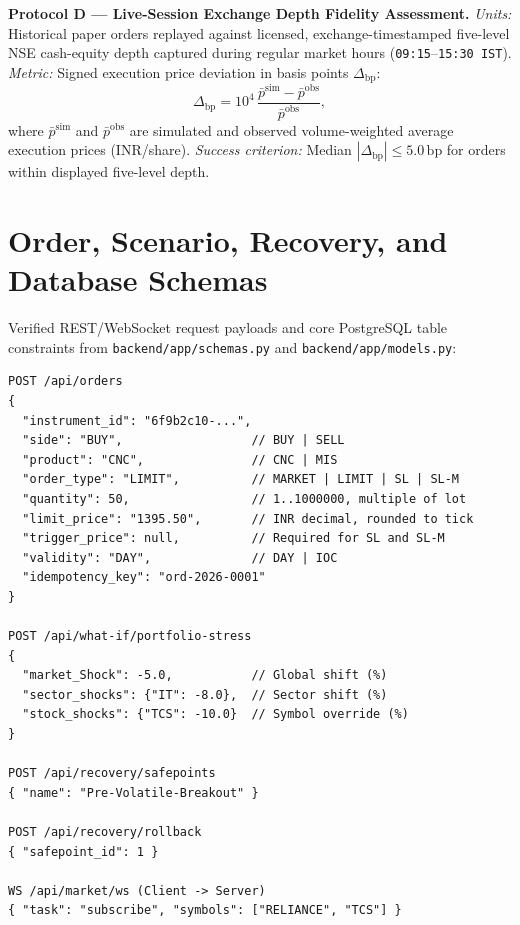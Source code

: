 \documentclass[journal,onecolumn,10pt]{IEEEtran}
\newcommand{\thinunit}[2]{#1\,\text{#2}}
\renewcommand{\thesection}{\arabic{section}}
\begin{document}
\textbf{Protocol D --- Live-Session Exchange Depth Fidelity Assessment.} \emph{Units:} Historical paper orders replayed against licensed, exchange-timestamped five-level NSE cash-equity depth captured during regular market hours (\texttt{09:15}--\texttt{15:30~IST}). \emph{Metric:} Signed execution price deviation in basis points $\Delta_{\mathrm{bp}}$:
\begin{equation}
\Delta_{\mathrm{bp}} = 10^{4}\,\frac{\bar{p}^{\mathrm{sim}}-\bar{p}^{\mathrm{obs}}}{\bar{p}^{\mathrm{obs}}},
\label{eq:metricD}
\end{equation}
where $\bar{p}^{\mathrm{sim}}$ and $\bar{p}^{\mathrm{obs}}$ are simulated and observed volume-weighted average execution prices (INR/share). \emph{Success criterion:} Median $|\Delta_{\mathrm{bp}}| \le \thinunit{5.0}{bp}$ for orders within displayed five-level depth.

\appendices
\renewcommand{\thesection}{Appendix \Alph{section}}
\section{Order, Scenario, Recovery, and Database Schemas}

Verified REST/WebSocket request payloads and core PostgreSQL table constraints from \texttt{backend/app/schemas.py} and \texttt{backend/app/models.py}:

\begin{lstlisting}
POST /api/orders
{
  "instrument_id": "6f9b2c10-...",
  "side": "BUY",                  // BUY | SELL
  "product": "CNC",               // CNC | MIS
  "order_type": "LIMIT",          // MARKET | LIMIT | SL | SL-M
  "quantity": 50,                 // 1..1000000, multiple of lot
  "limit_price": "1395.50",       // INR decimal, rounded to tick
  "trigger_price": null,          // Required for SL and SL-M
  "validity": "DAY",              // DAY | IOC
  "idempotency_key": "ord-2026-0001"
}

POST /api/what-if/portfolio-stress
{
  "market_Shock": -5.0,           // Global shift (%)
  "sector_shocks": {"IT": -8.0},  // Sector shift (%)
  "stock_shocks": {"TCS": -10.0}  // Symbol override (%)
}

POST /api/recovery/safepoints
{ "name": "Pre-Volatile-Breakout" }

POST /api/recovery/rollback
{ "safepoint_id": 1 }

WS /api/market/ws (Client -> Server)
{ "task": "subscribe", "symbols": ["RELIANCE", "TCS"] }
\end{lstlisting}
\end{document}
